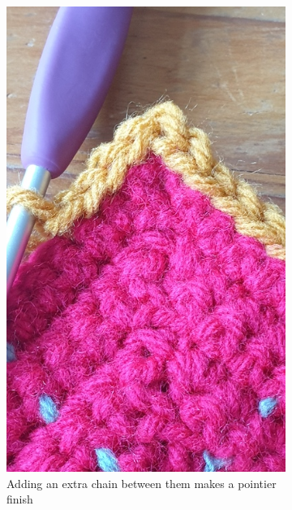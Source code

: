 \documentclass[openany]{book}
\begin{document}
\begin{figure}[H]
\begin{subfigure}[t]{.3\textwidth}
		\includegraphics[width=.95\textwidth]{bk/slstcorner2}
\caption{Adding an extra chain between them makes a pointier finish}
\end{subfigure}
%
\begin{subfigure}[t]{.3\textwidth}
		\centering

\end{subfigure}
\end{figure}
\end{document}
